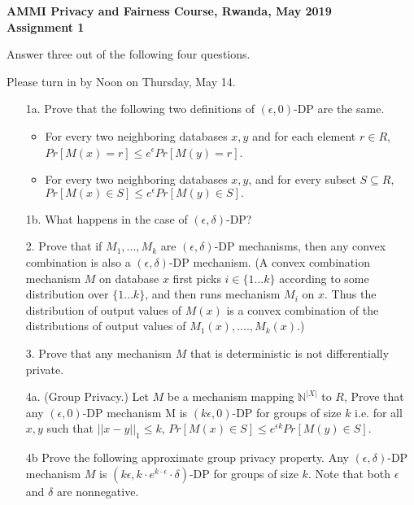 \documentclass{article}
\begin{document}
\begin{center}

{\bf AMMI Privacy and Fairness Course, Rwanda, May 2019}\\

{\bf Assignment 1}\\

\end{center}

Answer three out of the following four questions.

Please turn in by Noon on Thursday, May 14.

\begin{itemize}

\item[1a.] Prove that 
the following two definitions of $(\epsilon,0)$-DP are the same.

\begin{itemize}

\item For every two neighboring databases $x,y$ and
for each element $r \in R$,
$Pr[M(x)=r] \leq e^{\epsilon} Pr[M(y)=r] $.


\item For every two neighboring databases $x,y$, and for every
subset $S \subseteq R$, $Pr[M(x) \in S] \leq e^{\epsilon} Pr[M(y)\in S] .$

\end{itemize}

\item[1b.] What happens in the case of $(\epsilon,\delta)$-DP?

\item[2.] Prove that if $M_1,...,M_k$ are $(\epsilon,\delta)$-DP mechanisms,
then any convex combination is also a $(\epsilon,\delta)$-DP mechanism.
        (A convex combination mechanism $M$ on database $x$ first picks $i \in \{1\ldots k\}$
according to some distribution over $\{1\ldots k\}$, and then runs
mechanism $M_i$ on $x$. Thus the distribution of output values of
$M(x)$ is a convex combination of the distributions of output values
        of $M_1(x),....,M_k(x)$.)


\item[3.] Prove that any mechanism $M$ that is deterministic
is not differentially private.

\item[4a.] (Group Privacy.)
Let $M$ be a mechanism mapping $\mathbb{N}^{|X|}$ to $R$,
Prove that any $(\epsilon,0)$-DP mechanism M is
$(k\epsilon,0)$-DP
for groups of size $k$ i.e. for all $x,y$ such that
$||x - y||_1 \leq k$,
$Pr[M(x) \in S] \leq e^{\epsilon k} Pr[M(y) \in S]$.

\item[4b] Prove the following approximate group
privacy property. Any $(\epsilon,\delta)$-DP mechanism $M$
is $(k\epsilon, k \cdot e^{k\cdot \epsilon} \cdot \delta)$-DP
for groups of size $k$. Note that both $\epsilon$ and $\delta$ are nonnegative.

\end{itemize}
\end{document}
